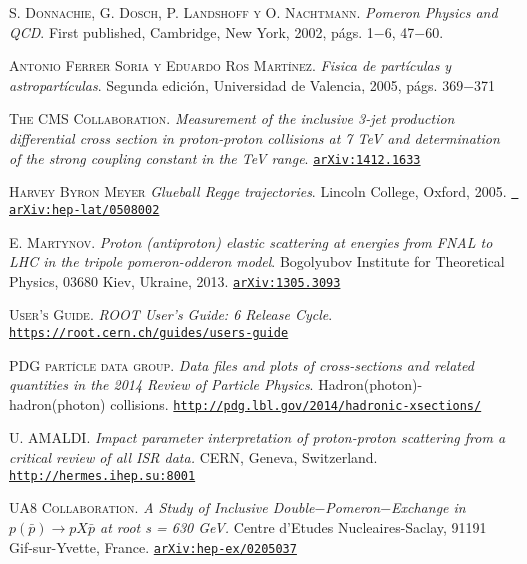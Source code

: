 \begin{thebibliography}{}
 \textsc{S. Donnachie, G. Dosch, P. Landshoff y O. Nachtmann.} \textit{Pomeron Physics and QCD}.
\textup{First published, Cambridge, New York, 2002, p\'ags. 1$-$6, 47$-$60.}

 \textsc{Antonio Ferrer Soria y Eduardo Ros Mart\'inez.} \textit{Fisica de part\'iculas y astropart\'iculas}.
\textup{Segunda edici\'on, Universidad de Valencia, 2005, p\'ags. 369$-$371}

 \textsc{The CMS Collaboration.}
 \textit{Measurement of the inclusive 3-jet production differential
cross section in proton-proton collisions at 7 TeV and
determination of the strong coupling constant in the  TeV
range}.
\href{https://arxiv.org/abs/1412.1633}{\texttt{arXiv:1412.1633}}

 \textsc{Harvey Byron Meyer}
 \textit{Glueball Regge trajectories}. \textup{Lincoln College, Oxford, 2005}. \href{https://arxiv.org/abs/hep-lat/0508002v1}{\texttt{	arXiv:hep-lat/0508002}}
 


 


  \textsc{E. Martynov.}
 \textit{Proton (antiproton) elastic scattering at energies from FNAL to LHC
in the tripole pomeron-odderon model}. \textup{Bogolyubov Institute for Theoretical Physics, 03680 Kiev, Ukraine, 2013.} \href{https://arxiv.org/abs/1305.3093v1}{\texttt{arXiv:1305.3093}}


  \textsc{User's Guide.}
 \textit{ROOT User's Guide: 6 Release Cycle}.\\
 \href{https://root.cern.ch/guides/users-guide}{\texttt{https://root.cern.ch/guides/users-guide}}
 
   \textsc{PDG part\'icle data group.}
 \textit{Data files and plots of cross-sections and related quantities
in the 2014 Review of Particle Physics}. \textup{Hadron(photon)-hadron(photon) collisions.} \href{http://pdg.lbl.gov/2014/hadronic-xsections/}{\texttt{http://pdg.lbl.gov/2014/hadronic-xsections/}}


 \textsc{U. AMALDI.}
 \textit{Impact parameter interpretation of proton-proton scattering from a critical review of all ISR data.} \textup{CERN, Geneva, Switzerland.}
 \href{http://hermes.ihep.su:8001/pool/mass/jou/np_166_301.pdf}{\texttt{http://hermes.ihep.su:8001}}
 

 \textsc{UA8 Collaboration.}
 \textit{A Study of Inclusive Double$-$Pomeron$-$Exchange in $p(\bar{p})\rightarrow pX\bar{p}$ at root s = 630 GeV.}
 \textup{Centre d'Etudes Nucleaires-Saclay, 91191 Gif-sur-Yvette, France.}
 \href{https://arxiv.org/abs/hep-ex/0205037v3}{\texttt{arXiv:hep-ex/0205037}} 
 

\end{thebibliography}
